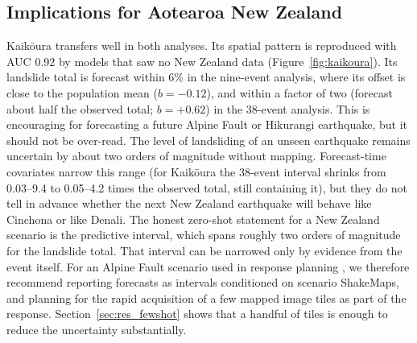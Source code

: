 
\subsection{Implications for Aotearoa New Zealand}
Kaik\={o}ura transfers well in both analyses. Its spatial pattern is reproduced with AUC 0.92 by models that saw no New Zealand data (Figure~\ref{fig:kaikoura}). Its landslide total is forecast within 6\% in the nine-event analysis, where its offset is close to the population mean ($b=-0.12$), and within a factor of two (forecast about half the observed total; $b=+0.62$) in the 38-event analysis. This is encouraging for forecasting a future Alpine Fault or Hikurangi earthquake, but it should not be over-read. The level of landsliding of an unseen earthquake remains uncertain by about two orders of magnitude without mapping. Forecast-time covariates narrow this range (for Kaik\={o}ura the 38-event interval shrinks from 0.03--9.4 to 0.05--4.2 times the observed total, still containing it), but they do not tell in advance whether the next New Zealand earthquake will behave like Cinchona or like Denali. The honest zero-shot statement for a New Zealand scenario is the predictive interval, which spans roughly two orders of magnitude for the landslide total. That interval can be narrowed only by evidence from the event itself. For an Alpine Fault scenario \citep{robinson2016} used in response planning \citep{orchiston2018}, we therefore recommend reporting forecasts as intervals conditioned on scenario ShakeMaps, and planning for the rapid acquisition of a few mapped image tiles as part of the response. Section~\ref{sec:res_fewshot} shows that a handful of tiles is enough to reduce the uncertainty substantially.

